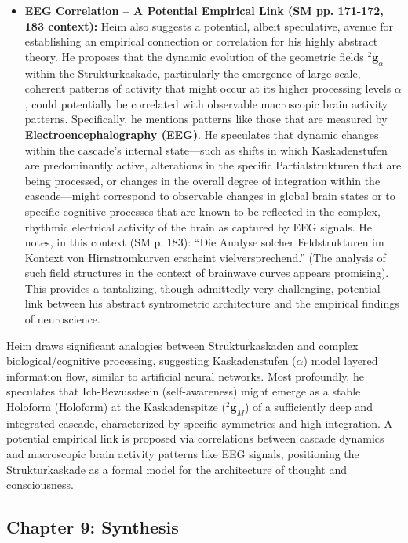 \documentclass[12pt]{article}
\newcommand{\q}[1]{\enquote{#1}}
\newcommand{\holoform}{\text{Holoform}}
\newcommand{\kompositionsfeld}{{}^2\mathbf{g}}
\newcommand{\kaskadenstufe}{\alpha}
\begin{document}
\begin{itemize}
    \item \textbf{EEG Correlation – A Potential Empirical Link (SM pp. 171-172, 183 context):}
    Heim also suggests a potential, albeit speculative, avenue for establishing an empirical connection or correlation for his highly abstract theory. He proposes that the dynamic evolution of the geometric fields \( \kompositionsfeld_\alpha \) within the Strukturkaskade, particularly the emergence of large-scale, coherent patterns of activity that might occur at its higher processing levels \( \kaskadenstufe \), could potentially be correlated with observable macroscopic brain activity patterns. Specifically, he mentions patterns like those that are measured by \textbf{Electroencephalography (EEG)}. He speculates that dynamic changes within the cascade's internal state—such as shifts in which Kaskadenstufen are predominantly active, alterations in the specific Partialstrukturen that are being processed, or changes in the overall degree of integration within the cascade—might correspond to observable changes in global brain states or to specific cognitive processes that are known to be reflected in the complex, rhythmic electrical activity of the brain as captured by EEG signals. He notes, in this context (SM p. 183): \q{Die Analyse solcher Feldstrukturen im Kontext von Hirnstromkurven erscheint vielversprechend.} (The analysis of such field structures in the context of brainwave curves appears promising). This provides a tantalizing, though admittedly very challenging, potential link between his abstract syntrometric architecture and the empirical findings of neuroscience.
\end{itemize}

Heim draws significant analogies between Strukturkaskaden and complex biological/cognitive processing, suggesting Kaskadenstufen (\(\kaskadenstufe\)) model layered information flow, similar to artificial neural networks. Most profoundly, he speculates that Ich-Bewusstsein (self-awareness) might emerge as a stable Holoform (\(\holoform\)) at the Kaskadenspitze (\(\kompositionsfeld_M\)) of a sufficiently deep and integrated cascade, characterized by specific symmetries and high integration. A potential empirical link is proposed via correlations between cascade dynamics and macroscopic brain activity patterns like EEG signals, positioning the Strukturkaskade as a formal model for the architecture of thought and consciousness.

\subsection{Chapter 9: Synthesis}
\label{sec:chapter9_synthesis}
\end{document}
